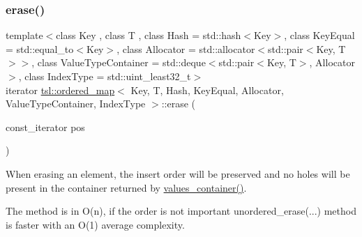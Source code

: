 \subsubsection{\texorpdfstring{erase()}{erase()}\hspace{0.1cm}{\footnotesize\ttfamily [2/7]}}
{\footnotesize\ttfamily template$<$class Key , class T , class Hash  = std\+::hash$<$\+Key$>$, class Key\+Equal  = std\+::equal\+\_\+to$<$\+Key$>$, class Allocator  = std\+::allocator$<$std\+::pair$<$\+Key, T$>$$>$, class Value\+Type\+Container  = std\+::deque$<$std\+::pair$<$\+Key, T$>$, Allocator$>$, class Index\+Type  = std\+::uint\+\_\+least32\+\_\+t$>$ \\
iterator \mbox{\hyperlink{classtsl_1_1ordered__map}{tsl\+::ordered\+\_\+map}}$<$ Key, T, Hash, Key\+Equal, Allocator, Value\+Type\+Container, Index\+Type $>$\+::erase (\begin{DoxyParamCaption}\item[{const\+\_\+iterator}]{pos }\end{DoxyParamCaption})\hspace{0.3cm}{\ttfamily [inline]}}





When erasing an element, the insert order will be preserved and no holes will be present in the container returned by \textquotesingle{}\mbox{\hyperlink{classtsl_1_1ordered__map_abb69bca0a80def48ae806078d77175cb}{values\+\_\+container()}}\textquotesingle{}.

The method is in O(n), if the order is not important \textquotesingle{}unordered\+\_\+erase(...)\textquotesingle{} method is faster with an O(1) average complexity. \mbox{\label{classtsl_1_1ordered__map_ae9a48c374849dba7c402f33b39c538b6}} 
